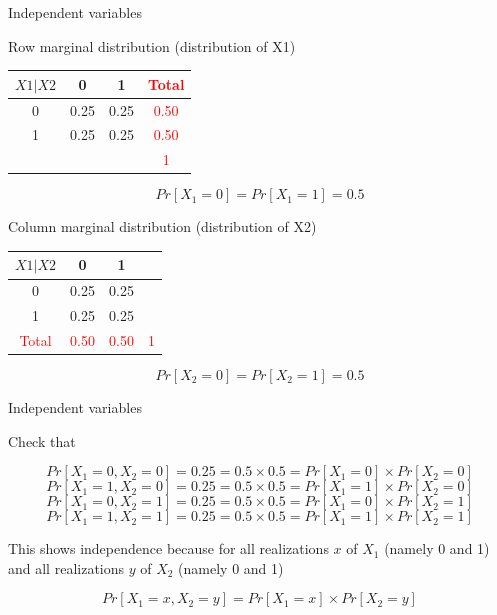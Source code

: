 \documentclass{beamer}\usepackage[]{graphicx}\usepackage[]{color}
\begin{document}
\begin{frame}[fragile]{Independent variables \;\;}

Row marginal distribution (distribution of X1)

\begin{tabular}{|c|c|c|c|}
\hline
$X1|X2$ & 0 & 1  & \textcolor{red}{Total}\\ \hline 
0 &  0.25 &  0.25  & \textcolor{red}{0.50}\\ \hline
1 &  0.25 &  0.25  & \textcolor{red}{0.50}\\ \hline
 & & & \textcolor{red}{1} \\ \hline
\end{tabular} \pause \newline

$$ Pr[X_1=0] = Pr[X_1 = 1] =0.5 $$

Column marginal distribution (distribution of X2) \pause \newline

\begin{tabular}{|c|c|c|c|}
\hline
$X1|X2$ & 0 & 1  & \\ \hline 
0 &  0.25 &  0.25  & \\ \hline
1 &  0.25 &  0.25  & \\ \hline
\textcolor{red}{Total} & \textcolor{red}{0.50} & \textcolor{red}{0.50} &  \textcolor{red}{1} \\ \hline
\end{tabular} \pause \newline 

$$ Pr[X_2=0] = Pr[X_2 = 1] =0.5 $$
\end{frame}


\begin{frame}[fragile]{Independent variables \;\;}

Check that 

$$ Pr[ X_1=0, X_2 =0 ] =0.25 = 0.5 \times 0.5 = Pr [X_1 = 0] \times Pr [X_2 =0] $$ \newline
$$ Pr[ X_1=1, X_2 =0 ] =0.25 = 0.5 \times 0.5 = Pr [X_1 = 1] \times Pr [X_2 =0] $$ \newline
$$ Pr[ X_1=0, X_2 =1 ] =0.25 = 0.5 \times 0.5 = Pr [X_1 = 0] \times Pr [X_2 =1] $$ \newline
$$ Pr[ X_1=1, X_2 =1 ] =0.25 = 0.5 \times 0.5 = Pr [X_1 = 1] \times Pr [X_2 =1] $$ \newline

This shows independence because for all realizations $x$ of $X_1$ (namely 0 and 1) and 
all realizations $y$ of $X_2$ (namely 0 and 1)

$$ Pr [X_1 =x, X_2 = y] = Pr [X_1 =x ] \times Pr [X_2=y] $$
\end{frame}
\end{document}

